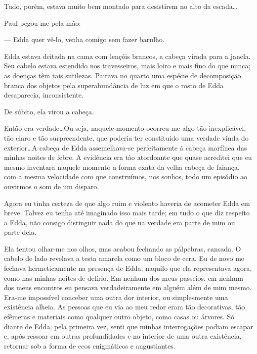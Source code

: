 Tudo, porém, estava muito bem montado para desistirem no alto da escada\dots


Paul pegou-me pela mão:

--- Edda quer vê-lo, venha comigo sem fazer barulho.

Edda estava deitada na cama com lençóis brancos, a cabeça virada para a janela. Seu cabelo estava estendido nos travesseiros, mais loiro e mais fino do que nunca; as doenças têm tais sutilezas. Pairava no quarto uma espécie de decomposição branca dos objetos pela superabundância de luz em que o rosto de Edda desaparecia, inconsistente.

De súbito, ela virou a cabeça.

Então era verdade\dots Ou seja, naquele momento ocorreu-me algo tão inexplicável, tão claro e tão surpreendente, que poderia ter constituído uma verdade vinda do exterior\dots A cabeça de Edda assemelhava-se perfeitamente à cabeça marfínea das minhas noites de febre. A evidência era tão atordoante que quase acreditei que eu mesmo inventara naquele momento a forma exata da velha cabeça de faiança, com a mesma velocidade com que construímos, nos sonhos, todo um episódio ao ouvirmos o som de um disparo.  

Agora eu tinha certeza de que algo ruim e violento haveria de acometer Edda em breve. Talvez eu tenha até imaginado isso mais tarde; em tudo o que diz respeito a Edda, não consigo distinguir nada do que na verdade era parte de mim ou parte dela.

Ela tentou olhar-me nos olhos, mas acabou fechando as pálpebras, cansada. O cabelo de lado revelava a testa amarela como um bloco de cera. Eu de novo me fechava hermeticamente na presença de Edda, naquilo que ela representava agora, como nas minhas noites de delírio. Em nenhum dos meus passeios, em nenhum dos meus encontros eu pensava verdadeiramente em alguém além de mim mesmo. Era-me impossível conceber uma outra dor interior, ou simplesmente uma existência alheia. As pessoas que eu via ao meu redor eram tão decorativas, tão efêmeras e materiais como qualquer outro objeto, como casas ou árvores. Só diante de Edda, pela primeira vez, senti que minhas interrogações podiam escapar e, após ressoar em outras profundidades e no interior de uma outra existência, retornar sob a forma de ecos enigmáticos e angustiantes.

